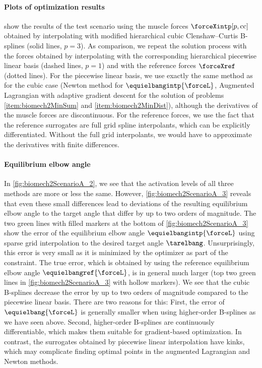 \paragraph{Plots of optimization results}

show the results of the test scenario using the muscle forces
$\forceXintp[p,\cc]$ obtained by interpolating with
modified hierarchical cubic Clenshaw--Curtis B-splines (solid lines, $p = 3$).
As comparison, we repeat the solution process
with the forces obtained by interpolating with the
corresponding hierarchical piecewise linear basis (dashed lines, $p = 1$) and
with the reference forces $\forceXref$ (dotted lines).
For the piecewise linear basis,
we use exactly the same method as for the cubic case
(Newton method for $\equielbangintp{\forceL}$,
Augmented Lagrangian with adaptive gradient descent for the
solution of problems \ref{item:biomech2MinSum} and \ref{item:biomech2MinDist}),
although the derivatives of the muscle forces are discontinuous.
For the reference forces, we use the fact that the reference surrogates
are full grid spline interpolants, which can be explicitly differentiated.
Without the full grid interpolants,
we would have to approximate the derivatives with finite differences.

\vspace*{\fill}
\pagebreak

\paragraph{Equilibrium elbow angle}

In \cref{fig:biomech2ScenarioA_2}, we see that the activation levels
of all three methods are more or less the same.
However, \cref{fig:biomech2ScenarioA_3} reveals that even these small
differences lead to deviations of the resulting equilibrium elbow angle
to the target angle that differ by up to two orders of magnitude.
The two green lines with filled markers at the bottom of
\cref{fig:biomech2ScenarioA_3} show the error of
the equilibrium elbow angle $\equielbangintp{\forceL}$
using sparse grid interpolation to the desired target angle $\tarelbang$.
Unsurprisingly, this error is very small as
it is minimized by the optimizer as part of the constraint.
The true error, which is obtained by
using the reference equilibrium elbow angle $\equielbangref{\forceL}$,
is in general much larger
(top two green lines in \cref{fig:biomech2ScenarioA_3}
with hollow markers).
We see that the cubic B-splines decrease the error
by up to two orders of magnitude compared to the
piecewise linear basis.
There are two reasons for this:
First, the error of $\equielbang{\forceL}$ is generally smaller
when using higher-order B-splines as we have seen above.
Second, higher-order B-splines are continuously differentiable,
which makes them suitable for gradient-based optimization.
In contrast, the surrogates obtained by piecewise linear interpolation
have kinks, which may complicate finding optimal points
in the augmented Lagrangian and Newton methods.

